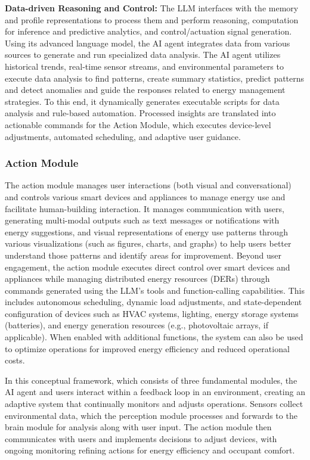 \documentclass[final,3p,times]{elsarticle}
\begin{document}
\textbf{Data-driven Reasoning and Control:} The LLM interfaces with the memory and profile representations to process them and perform reasoning, computation for inference and predictive analytics, and control/actuation signal generation. Using its advanced language model, the AI agent integrates data from various sources to generate and run specialized data analysis. The AI agent utilizes historical trends, real-time sensor streams, and environmental parameters to execute data analysis to find patterns, create summary statistics, predict patterns and detect anomalies and guide the responses related to energy management strategies. To this end, it dynamically generates executable scripts for data analysis and rule-based automation. Processed insights are translated into actionable commands for the Action Module, which executes device-level adjustments, automated scheduling, and adaptive user guidance.

\subsubsection{Action Module} 
The action module manages user interactions (both visual and conversational) and controls various smart devices and appliances to manage energy use and facilitate human-building interaction. It manages communication with users, generating multi-modal outputs such as text messages or notifications with energy suggestions, and visual representations of energy use patterns through various visualizations (such as figures, charts, and graphs) to help users better understand those patterns and identify areas for improvement. Beyond user engagement, the action module executes direct control over smart devices and appliances while managing distributed energy resources (DERs) through commands generated using the LLM’s tools and function-calling capabilities. This includes autonomous scheduling, dynamic load adjustments, and state-dependent configuration of devices such as HVAC systems, lighting, energy storage systems (batteries), and energy generation resources (e.g., photovoltaic arrays, if applicable). When enabled with additional functions, the system can also be used to optimize operations for improved energy efficiency and reduced operational costs.

In this conceptual framework, which consists of three fundamental modules, the AI agent and users interact within a feedback loop in an environment, creating an adaptive system that continually monitors and adjusts operations. Sensors collect environmental data, which the perception module processes and forwards to the brain module for analysis along with user input. The action module then communicates with users and implements decisions to adjust devices, with ongoing monitoring refining actions for energy efficiency and occupant comfort.
\end{document}
